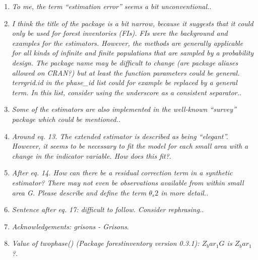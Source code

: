 \documentclass{article}
\begin{document}
\begin{enumerate}
\answerfin{}

\item \textit{To me, the term “estimation error” seems a bit unconventional.}.

\answerfin{}

\item \textit{I think the title of the package is a bit narrow, because it suggests that it could only be used for forest inventories (FIs). FIs were the background and examples for the estimators. However, the methods are generally applicable for all kinds of infinite and finite populations that are sampled by a probability design. The package name may be difficult to change (are package aliases allowed on CRAN?) but at least the function parameters could be general. terrgrid.id in the phase\_id list could for example be replaced by a general term. In this list, consider using the underscore as a consistent separator.}.

\answerfin{}

\item \textit{Some of the estimators are also implemented in the well-known “survey” package which could be mentioned.}.

\answerfin{}

\item \textit{Around eq. 13. The extended estimator is described as being “elegant”. However, it seems to be necessary to fit the model for each small area with a change in the indicator variable. How does this fit?}.

\answerfin{}

\item \textit{After eq. 14. How can there be a residual correction term in a synthetic estimator? There may not even be observations available from within small area G. Please describe and define the term $\theta_s2$ in more detail.}.

\answerfin{}

\item \textit{Sentence after eq. 17: difficult to follow. Consider rephrasing.}.

\answerfin{}

\item \textit{Acknowledgements: grisons - Grisons}.

\answerfin{}

\item \textit{Value of twophase() (Package forestinventory version 0.3.1): $Z_bar_1G$ is $Z_bar_1$?}.

\answerfin{}

\end{enumerate}
  
\end{document}
